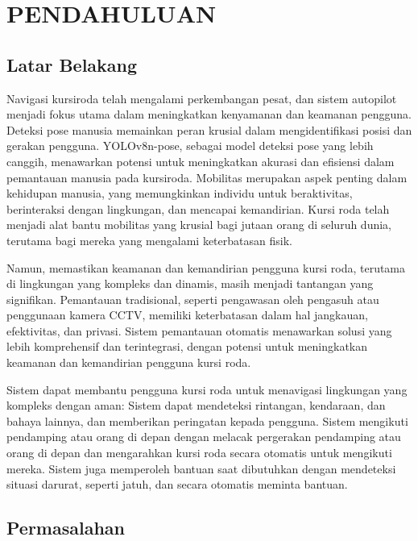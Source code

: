 \chapter{PENDAHULUAN}
\label{chap:pendahuluan}


\section{Latar Belakang}
\label{sec:latarbelakang}

Navigasi kursiroda telah mengalami perkembangan pesat, dan sistem autopilot menjadi fokus utama dalam meningkatkan kenyamanan dan keamanan pengguna. Deteksi pose manusia memainkan peran krusial dalam mengidentifikasi posisi dan gerakan pengguna. YOLOv8n-pose, sebagai model deteksi pose yang lebih canggih, menawarkan potensi untuk meningkatkan akurasi dan efisiensi dalam pemantauan manusia pada kursiroda.
Mobilitas merupakan aspek penting dalam kehidupan manusia, yang memungkinkan individu untuk beraktivitas, berinteraksi dengan lingkungan, dan mencapai kemandirian. Kursi roda telah menjadi alat bantu mobilitas yang krusial bagi jutaan orang di seluruh dunia, terutama bagi mereka yang mengalami keterbatasan fisik.

Namun, memastikan keamanan dan kemandirian pengguna kursi roda, terutama di lingkungan yang kompleks dan dinamis, masih menjadi tantangan yang signifikan. Pemantauan tradisional, seperti pengawasan oleh pengasuh atau penggunaan kamera CCTV, memiliki keterbatasan dalam hal jangkauan, efektivitas, dan privasi.
Sistem pemantauan otomatis menawarkan solusi yang lebih komprehensif dan terintegrasi, dengan potensi untuk meningkatkan keamanan dan kemandirian pengguna kursi roda.

Sistem dapat membantu pengguna kursi roda untuk menavigasi lingkungan yang kompleks dengan aman: Sistem dapat mendeteksi rintangan, kendaraan, dan bahaya lainnya, dan memberikan peringatan kepada pengguna.
Sistem mengikuti pendamping atau orang di depan dengan melacak pergerakan pendamping atau orang di depan dan mengarahkan kursi roda secara otomatis untuk mengikuti mereka.
Sistem juga memperoleh bantuan saat dibutuhkan dengan mendeteksi situasi darurat, seperti jatuh, dan secara otomatis meminta bantuan.


\section{Permasalahan}
\label{sec:permasalahan}

